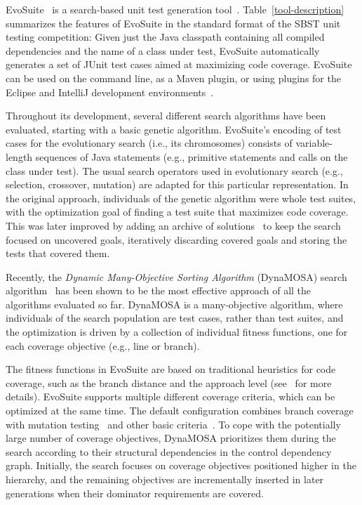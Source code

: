 \documentclass[sigconf]{acmart}
\newcommand{\EVOSUITE}{{\sc EvoSuite}\xspace}
\begin{document}
\EVOSUITE~\cite{FrA11c} is a search-based unit test generation
tool~\cite{GoA_TSE12}. Table~\ref{tool-description} summarizes the features of
\EVOSUITE in the standard format of the SBST unit testing competition: Given
just the Java classpath containing all compiled dependencies and the name of a
class under test, \EVOSUITE automatically generates a set of JUnit test cases
aimed at maximizing code coverage. \EVOSUITE can be used on the command line,
as a Maven plugin, or using plugins for the Eclipse and IntelliJ development
environments~\cite{ICST16_Tool}.

Throughout its development, several different search algorithms have
been evaluated, starting with a basic genetic algorithm. \EVOSUITE's encoding of test cases for the evolutionary search (i.e., its chromosomes) consists of variable-length sequences of Java statements (e.g., primitive statements and calls on the class under test). The usual search operators used in evolutionary search (e.g., selection, crossover, mutation) are adapted for this particular representation. 
%
In the original approach, individuals of the genetic algorithm were whole test
suites, with the optimization goal of finding a test suite that maximizes code
coverage. This was later improved by adding an archive of
solutions~\cite{emse_archive} to keep the search focused on uncovered goals,
iteratively discarding covered goals and storing the tests that covered them.

Recently, the \textit{Dynamic Many-Objective Sorting Algorithm} (DynaMOSA) search algorithm~\cite{dynamosa, panichella:ssbse2018, panichella2018large}  has been shown to be the most effective approach of all the algorithms evaluated so far. DynaMOSA is a many-objective algorithm, where individuals of the search population are test cases, rather than test suites, and the optimization is driven by a collection of individual fitness functions, one for each coverage objective (e.g., line or branch).

The fitness functions in \EVOSUITE are based on traditional heuristics for code
coverage, such as the branch distance and the approach level
(see~\cite{GoA_TSE12} for more details).
%
\EVOSUITE supports multiple different coverage criteria, which can be optimized
at the same time. The default configuration combines branch coverage with
mutation testing~\cite{emse14_mutation} and other basic
criteria~\cite{rojas2015combining}.
%
To cope with the potentially large number of coverage objectives,
DynaMOSA prioritizes them during the search according to their structural
dependencies in the control dependency graph. Initially, the search focuses on
coverage objectives positioned higher in the hierarchy, and the remaining
objectives are incrementally inserted in later generations when their dominator
requirements are covered.
\end{document}
